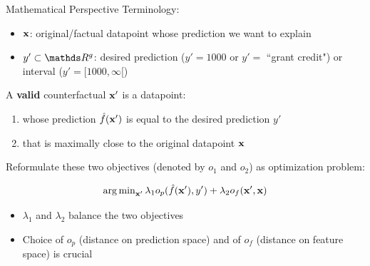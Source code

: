 \documentclass[11pt,compress,t,notes=noshow, aspectratio=169, xcolor=table, usenames,dvipsnames]{beamer}
\begin{document}
\begin{frame}{Mathematical Perspective}
	Terminology:
	\begin{itemize}
		\item $\xv$: original/factual datapoint whose prediction we want to explain
		\item $y' \subset \R^g$: desired prediction ($y' = 1000$ or $y' =$ ``grant credit") or interval ($y' = [1000, \infty[$)
	\end{itemize}
	\lz\pause
	A \textbf{valid} counterfactual $\xv'$ is a datapoint:
	\begin{enumerate}
		\item whose prediction $\fh(\xv')$ is equal to the desired prediction $y'$
		\item that is maximally close to the original datapoint $\xv$
	\end{enumerate}
	\lz\pause
	Reformulate these two objectives (denoted by $o_1$ and $o_2$) as optimization problem:
	
$$\argmin_{\xv'} \lambda_1 o_p(\fh(\xv'), y') + \lambda_2 o_f(\xv', \xv)$$

	\begin{itemize}
		\item $\lambda_1$ and $\lambda_2$ balance the two objectives
		\item Choice of $o_p$ (distance on prediction space) and of $o_f$ (distance on feature space) is crucial
	\end{itemize}
\end{frame}
\end{document}
